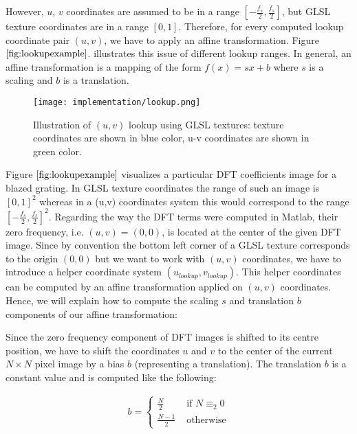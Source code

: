 However, $u$, $v$ coordinates are assumed to be in a range $[-\frac{f_s}{2}, \frac{f_s}{2}]$, but GLSL texture coordinates are in a range $[0,1]$. Therefore, for every computed lookup coordinate pair $(u,v)$, we have to apply an affine transformation. Figure $\ref{fig:lookupexample}$.  illustrates this issue of different lookup ranges. In general, an affine transformation is a mapping of the form $f(x) = sx + b$ where $s$ is a scaling and $b$ is a translation.

\begin{figure}[H]
  \centering
  \texttt{[image: implementation/lookup.png]}
  \caption[Lookup DFT Coefficients in Textures]{Illustration of $(u,v)$ lookup using GLSL textures: texture coordinates are shown in blue color, u-v coordinates are shown in green color.}
\label{fig:lookupexample}
\end{figure}

Figure $\ref{fig:lookupexample}$ visualizes a particular DFT coefficients image for a blazed grating. In GLSL texture coordinates the range of such an image is $[0,1]^2$ whereas in a (u,v) coordinates system this would correspond to the range $[-\frac{f_s}{2}, \frac{f_s}{2}]^2$. Regarding the way the DFT terms were computed in Matlab, their zero frequency, i.e. $(u,v) = (0,0)$, is located at the center of the given DFT image. Since by convention the bottom left corner of a GLSL texture corresponds to the origin $(0,0)$ but we want to work with $(u,v)$ coordinates, we have to introduce a helper coordinate system $(u_{lookup}, v_{lookup})$. This helper coordinates can be computed by an affine transformation applied on $(u,v)$ coordinates. Hence, we will explain how to compute the scaling $s$ and translation $b$ components of our affine transformation: 

Since the zero frequency component of DFT images is shifted to its centre position, we have to shift the coordinates $u$ and $v$ to the center of the current $N \times N$ pixel image by a bias $b$ (representing a translation). The translation $b$ is a constant value and is computed like the following:

\begin{align}
b = \left\{ \begin{array}{rl}
\frac{N}{2} &\mbox{ if $N \equiv_2 0$} \\
\frac{N-1}{2} &\mbox{ otherwise}
\end{array} \right.
\label{eq:bias}
\end{align}

